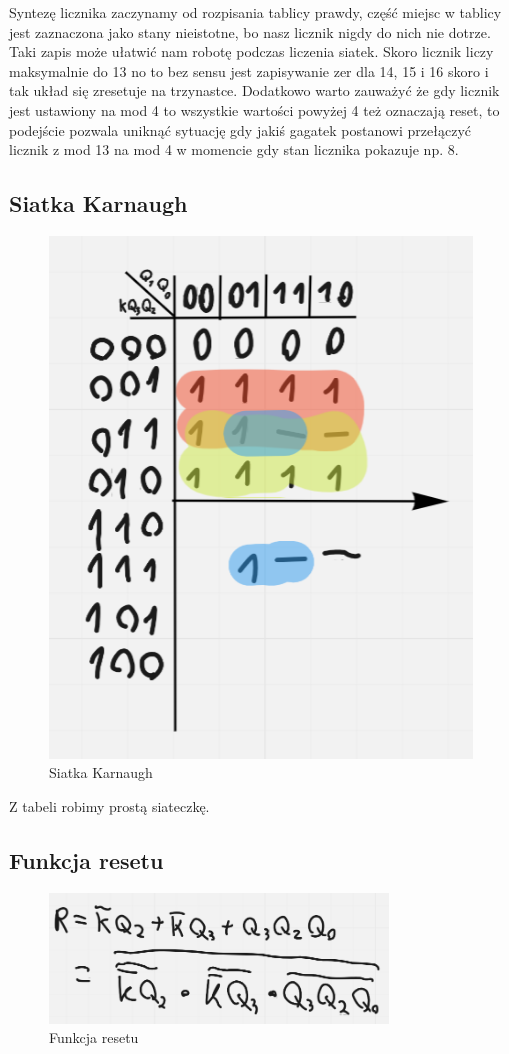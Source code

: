 \newpage

Syntezę licznika zaczynamy od rozpisania tablicy prawdy, część miejsc w tablicy jest zaznaczona jako stany nieistotne, bo nasz licznik nigdy do nich nie dotrze. Taki zapis może ułatwić nam robotę podczas liczenia siatek. Skoro licznik liczy maksymalnie do 13 no to bez sensu jest zapisywanie zer dla 14, 15 i 16 skoro i tak układ się zresetuje na trzynastce. Dodatkowo warto zauważyć że gdy licznik jest ustawiony na mod 4 to wszystkie wartości powyżej 4 też oznaczają reset, to podejście pozwala uniknąć sytuację gdy jakiś gagatek postanowi przełączyć licznik z mod 13 na mod 4 w momencie gdy stan licznika pokazuje np. 8.

\subsection{Siatka Karnaugh}

\begin{figure}[h!]
    \centering
    \includegraphics[width = .3\textwidth]{images/async/async_k.png}
    \caption{Siatka Karnaugh}
    \label{fig:my_label}
\end{figure}

Z tabeli robimy prostą siateczkę.

\subsection{Funkcja resetu}

\begin{figure}[h!]
    \centering
    \includegraphics[width = 9cm]{images/async/async_e.png}
    \caption{Funkcja resetu}
    \label{fig:my_label}
\end{figure}


